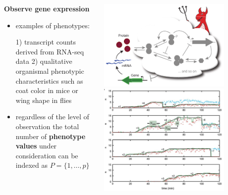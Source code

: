 \begin{frame}
\begin{columns}[c]
\begin{column}{0.5\textwidth}
\begin{block}{\textbf{Observe gene expression}}
\begin{itemize}
\item examples of phenotypes: \begin{small}
1) transcript counts derived from RNA-seq data 2) qualitative organismal phenotypic characteristics such as coat color in mice or wing shape in flies
\end{small}
\item regardless of the level of observation the total number of \textbf{phenotype values} under consideration can be indexed as $P = \{ 1, \ldots, p \} $
\end{itemize}
\end{block}
\end{column}
\begin{column}{0.5\textwidth}
\begin{center}
\includegraphics[width=0.8\textwidth]{fig/geneexpressiondemon.pdf}
\cite{Lestas2010}
\includegraphics[width=0.8\textwidth]{fig/transcriptcounts.png}
\cite{Golding2005}
\end{center}
\end{column}
\end{columns}
\end{frame}

